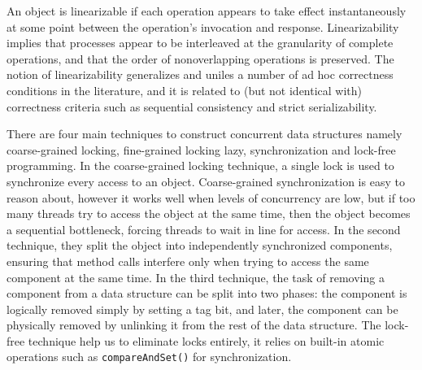 An object is linearizable if each operation appears
to take effect instantaneously at some point between the operation’s invocation
and response. Linearizability implies that processes appear to be interleaved
at the granularity of complete operations, and that the order of
nonoverlapping operations is preserved. The notion of linearizability generalizes and uniles a number of ad hoc correctness conditions in the literature, and it is related to (but not identical with) correctness criteria such as sequential consistency and strict serializability.
 
 There are four main techniques to construct concurrent data structures namely coarse-grained locking, fine-grained locking lazy, synchronization and lock-free programming. In the coarse-grained locking technique, a single lock is used to synchronize every access to an object. Coarse-grained synchronization is easy to reason about, however it works well when levels of concurrency are low, but if too many threads try to access the object at the same time, then the object becomes a sequential bottleneck, forcing threads to wait in line for access. In the second technique, they split the object into independently synchronized components, ensuring that method calls interfere only when trying to access the same component at the same time. In the third technique, the task of removing a component from a data structure can be split into two phases: the component is logically removed simply by setting a tag bit, and later, the component can be physically removed by unlinking it from the rest of the data structure. The lock-free technique help us to eliminate locks entirely, it relies on built-in atomic operations such as {\tt compareAndSet()} for synchronization.
 
